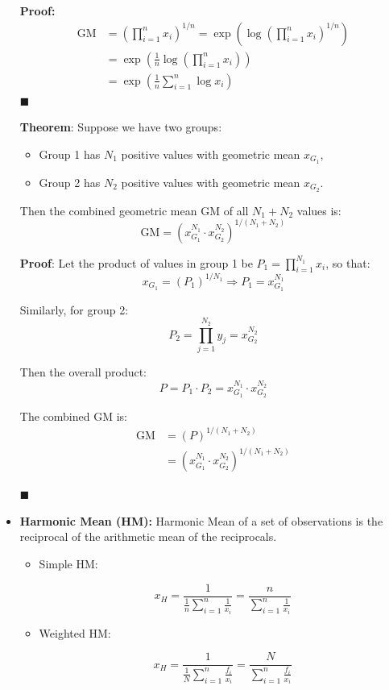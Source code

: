 \documentclass[twoside]{book}
\begin{document}
\begin{itemize}
\textbf{Proof:}
\begin{align*}
\mathrm{GM} &= \left( \prod_{i=1}^n x_i \right)^{1/n} = \exp\left( \log \left( \prod_{i=1}^n x_i \right)^{1/n} \right) \\
            &= \exp\left( \frac{1}{n} \log \left( \prod_{i=1}^n x_i \right) \right) \\
            &= \exp\left( \frac{1}{n} \sum_{i=1}^n \log x_i \right)
\end{align*}
\hfill $\blacksquare$

\begin{textbox}
\textbf{Theorem}: Suppose we have two groups:
\begin{itemize}
  \item Group 1 has \( N_1 \) positive values with geometric mean \( x_{G_1} \),
  \item Group 2 has \( N_2 \) positive values with geometric mean \( x_{G_2} \).
\end{itemize}
Then the combined geometric mean \( \mathrm{GM} \) of all \( N_1 + N_2 \) values is:
\[
\mathrm{GM} = \left( x_{G_1}^{N_1} \cdot x_{G_2}^{N_2} \right)^{1/(N_1 + N_2)}
\]
\end{textbox}

\textbf{Proof}: Let the product of values in group 1 be \( P_1 = \prod_{i=1}^{N_1} x_i \), so that:
\[
x_{G_1} = \left( P_1 \right)^{1/N_1} \Rightarrow P_1 = x_{G_1}^{N_1}
\]

Similarly, for group 2:
\[
P_2 = \prod_{j=1}^{N_2} y_j = x_{G_2}^{N_2}
\]

Then the overall product:
\[
P = P_1 \cdot P_2 = x_{G_1}^{N_1} \cdot x_{G_2}^{N_2}
\]

The combined GM is:
\begin{align*}
\mathrm{GM} &= \left( P \right)^{1/(N_1 + N_2)} \\
            &= \left( x_{G_1}^{N_1} \cdot x_{G_2}^{N_2} \right)^{1/(N_1 + N_2)}
\end{align*}

\hfill $\blacksquare$

    \item \textbf{Harmonic Mean (HM):} Harmonic Mean of a set of observations is the reciprocal of the arithmetic mean of the reciprocals.
    \begin{itemize}
        \item Simple HM:
        \begin{textbox}
    \[
    x_H = \dfrac{1}{ \frac{1}{n}\sum_{i=1}^{n} \frac{1}{x_i}} = \dfrac{n}{\sum_{i=1}^{n} \frac{1}{x_i}}
    \]
    \end{textbox}
    \item Weighted HM:
    \begin{textbox}
    \[
    x_H = \dfrac{1}{ \frac{1}{N}\sum_{i=1}^{n} \frac{f_i}{x_i}} = \dfrac{N}{\sum_{i=1}^{n} \frac{f_i}{x_i}}
    \]
    \end{textbox}
    \end{itemize}

\end{itemize}
\end{document}
